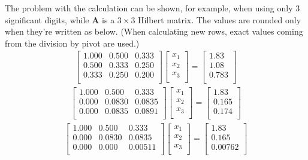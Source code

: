 \documentclass[a4paper,12pt]{scrartcl}
\begin{document}
The problem with the calculation can be shown, for example, when using only 3 significant digits, while $\mathbf{A}$ is a $3\times3$ Hilbert matrix. The values are rounded only when they're written as below. (When calculating new rows, exact values coming from the division by pivot are used.)
\begin{align*}
    \begin{bmatrix}
        1.000 & 0.500 & 0.333 \\
        0.500 & 0.333 & 0.250 \\
        0.333 & 0.250 & 0.200 \\
    \end{bmatrix}
    \begin{bmatrix}
        x_1 \\
        x_2 \\
        x_3 \\
    \end{bmatrix}
=
    \begin{bmatrix}
        1.83 \\
        1.08 \\
        0.783 \\
    \end{bmatrix}
\end{align*}
\begin{align*}
    \begin{bmatrix}
        1.000 & 0.500 & 0.333 \\
        0.000 & 0.0830 & 0.0835 \\
        0.000 & 0.0835 & 0.0891 \\
    \end{bmatrix}
    \begin{bmatrix}
        x_1 \\
        x_2 \\
        x_3 \\
    \end{bmatrix}
=
    \begin{bmatrix}
        1.83 \\
        0.165 \\
        0.174 \\
    \end{bmatrix}
\end{align*}
\begin{align*}
    \begin{bmatrix}
        1.000 & 0.500 & 0.333 \\
        0.000 & 0.0830 & 0.0835 \\
        0.000 & 0.000 & 0.00511 \\
    \end{bmatrix}
    \begin{bmatrix}
        x_1 \\
        x_2 \\
        x_3 \\
    \end{bmatrix}
=
    \begin{bmatrix}
        1.83 \\
        0.165 \\
        0.00762 \\
    \end{bmatrix}
\end{align*}
\end{document}
